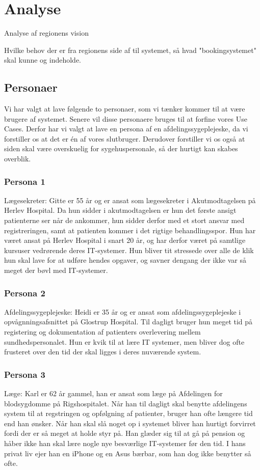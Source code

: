 \section{Analyse}
Analyse af regionens vision

Hvilke behov der er fra regionens side af til systemet, så hvad "bookingsystemet" skal kunne og indeholde.


\subsection{Personaer}
Vi har valgt at lave følgende to personaer, som vi tænker kommer til at være brugere af systemet. 
Senere vil disse personaere bruges til at forfine vores Use Cases. Derfor har vi valgt at lave en persona af en afdelingssygeplejeske, da vi forstiller os at det er én af vores slutbruger. Derudover forstiller vi os også at siden skal være overskuelig for sygehuspersonale, så der hurtigt kan skabes overblik. 


\subsubsection{Persona 1}
Lægesekreter:
Gitte er 55 år og er ansat som lægesekreter i Akutmodtagelsen på Herlev Hospital. Da hun sidder i akutmodtagelsen er hun det første ansigt patienterne ser når de ankommer, hun sidder derfor med et stort ansvar med registreringen, samt at patienten kommer i det rigtige behandlingsspor. Hun har været ansat på Herlev Hospital i snart 20 år, og har derfor været på samtlige kursuser vedrørende deres IT-systemer. Hun bliver tit stressede over alle de klik hun skal lave for at udføre hendes opgaver, og savner dengang der ikke var så meget der bøvl med IT-systemer. 


\subsubsection{Persona 2}
Afdelingssygeplejeske: 
Heidi er 35 år og er ansat som afdelingssygeplejeske i opvågnningsafsnittet på Glostrup Hospital. Til dagligt bruger hun meget tid på registering og dokumentation af patienters overlevering mellem sundhedspersonalet. Hun er kvik til at lære IT systemer, men bliver dog ofte frusteret over den tid der skal ligges i deres nuværende system. 


\subsubsection{Persona 3}
Læge: 
Karl er 62 år gammel, han er ansat som læge på Afdelingen for blodsygdomme på Rigshospitalet. Når han til dagligt skal benytte afdelingens system til at regstringen og opfølgning af patienter, bruger han ofte længere tid end han ønsker. Når han skal slå noget op i systemet bliver han hurtigt forvirret fordi der er så meget at holde styr på. Han glæder sig til at gå på pension og håber ikke han skal lære nogle nye besværlige IT-systemer før den tid.
I hans privat liv ejer han en iPhone og en Asus bærbar, som han dog ikke benytter så ofte. 
